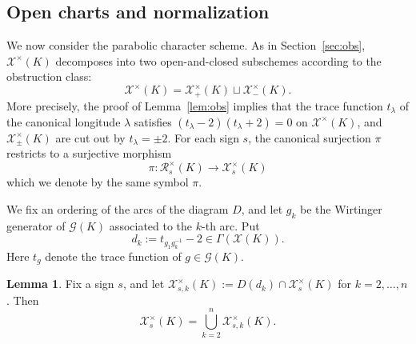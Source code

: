 \documentclass[12pt,reqno]{amsart}
\newcommand{\calX}{\mathcal{X}}
\newcommand{\calG}{\mathcal{G}}
\newcommand{\calR}{\mathcal{R}}
\theoremstyle{definition}
\newtheorem{lemma}[theorem]{Lemma}
\begin{document}
	
	\subsection{Open charts and normalization}
	
	We now consider the parabolic character scheme. As in Section~\ref{sec:obs}, $\calX^\times(K)$ decomposes into two open-and-closed subschemes according to the obstruction class:
	\[
	   \calX^\times(K) = \calX^\times_+(K) \sqcup \calX^\times_-(K).
	\]
    More precisely, the proof of Lemma~\ref{lem:obs} implies that the trace function $t_\lambda$ of the canonical longitude $\lambda$ satisfies $(t_\lambda-2)(t_\lambda+2)=0$ on $\calX^\times(K)$, and $\calX^\times_{\pm}(K)$ are cut out by $t_\lambda = \pm2$. For each sign $s$, the canonical surjection $\pi$
	restricts to a surjective morphism
	$$\pi:\calR_s^\times(K) \rightarrow\calX_s^\times(K)$$
	which we denote by the same symbol $\pi$.
	
	We fix an ordering of the arcs of the diagram $D$, and  let $g_k$ be the Wirtinger generator of $\calG(K)$ associated to the $k$-th arc. Put
	\[
	d_k := t_{g_{1}g_{k}^{-1}}-2 \in \Gamma (\calX(K)).
	\]
	Here $t_g$ denote the trace function of $g\in\calG(K)$.
	
	\begin{lemma}
		\label{lem:xdeocmp}
		Fix a sign $s$, and let $\calX^\times_{s,k}(K) := D(d_k)\cap\calX^\times_s(K)$ for $k=2,\ldots,n$.
		Then
		\[
		\calX^\times_s(K) =	\bigcup_{k=2}^n \calX^\times_{s,k}(K).
		\]
	\end{lemma}
	
\end{document}
